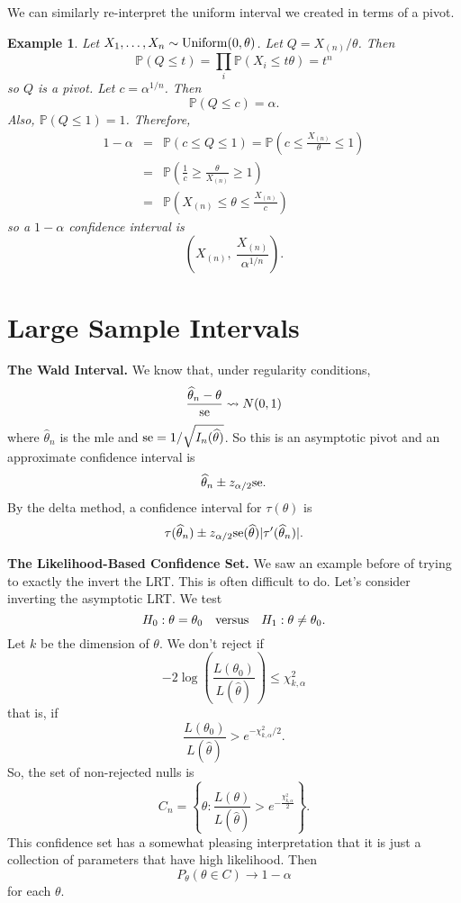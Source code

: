 \documentclass[twoside,12pt]{article}
\newtheorem{example}[theorem]{Example}
\begin{document}
We can similarly re-interpret the uniform interval we created in terms of a pivot.

\begin{example}
Let $X_1,\ldots, X_n\sim {\rm Uniform}(0,\theta)$.
Let $Q = X_{(n)}/\theta$.
Then
$$
\mathbb{P}(Q \leq t ) = \prod_i \mathbb{P}(X_i  \leq t\theta ) = t^n
$$
so $Q$ is a pivot.
Let $c = \alpha^{1/n}$.
Then
$$
\mathbb{P}( Q \leq c) = \alpha.
$$
Also, $\mathbb{P}(Q\leq 1)=1$.
Therefore,
\begin{eqnarray*}
1-\alpha &=& \mathbb{P}( c \leq Q \leq 1) = 
\mathbb{P}\left( c \leq \frac{X_{(n)}}{\theta} \leq 1\right)\\
&=& \mathbb{P}\left( \frac{1}{c} \geq \frac{\theta}{X_{(n)}} \geq 1\right)\\
&=& \mathbb{P}\left( X_{(n)} \leq \theta \leq \frac{X_{(n)}}{c}\right)
\end{eqnarray*}
so a $1-\alpha$ confidence interval is
$$
\left(  X_{(n)},\  \frac{X_{(n)}}{\alpha^{1/n}}\right).
$$
\end{example}

\section{Large Sample Intervals}

{\bf The Wald Interval.}
We know that, under regularity conditions,
$$
\frac{\widehat\theta_n - \theta}{\rm se}\rightsquigarrow N(0,1)
$$
where
$\widehat\theta_n$ is the mle and
${\rm se} = 1/\sqrt{I_n(\widehat\theta)}$.
So this is an asymptotic pivot
and an approximate confidence interval is
$$
\widehat\theta_n \pm z_{\alpha/2} {\rm se}.
$$
By the delta method,
a confidence interval for $\tau(\theta)$ is
$$
\tau(\widehat\theta_n) \pm z_{\alpha/2} {\rm se}(\widehat\theta) |\tau'(\widehat\theta_n)|.
$$

\vspace{1cm}

{\bf The Likelihood-Based Confidence Set.} We saw an example before of trying to exactly the invert the LRT. This is often difficult to do.
Let's consider inverting the asymptotic LRT.
We test
$$
H_0: \theta=\theta_0\ \ \ {\rm versus}\ \ \ H_1 :\theta \neq \theta_0.
$$
Let $k$ be the dimension of $\theta$.
We don't reject if
$$
-2 \log \left(\frac{L(\theta_0)}{L(\widehat\theta)}\right) \leq \chi^2_{k,\alpha} 
$$
that is, if
$$
\frac{L(\theta_0)}{L(\widehat\theta)} > e^{-\chi^2_{k,\alpha}/2}.
$$
So, the set of non-rejected nulls is
$$
C_n = \left\{\theta:
\frac{L(\theta)}{L(\widehat\theta)} > e^{-\frac{\chi^2_{k,\alpha}}{2}}\right\}.
$$
This confidence set has a somewhat pleasing interpretation that it is just a collection of parameters that have high likelihood.
Then
$$
P_\theta(\theta\in C) \to 1-\alpha
$$
for each $\theta$.
\end{document}
